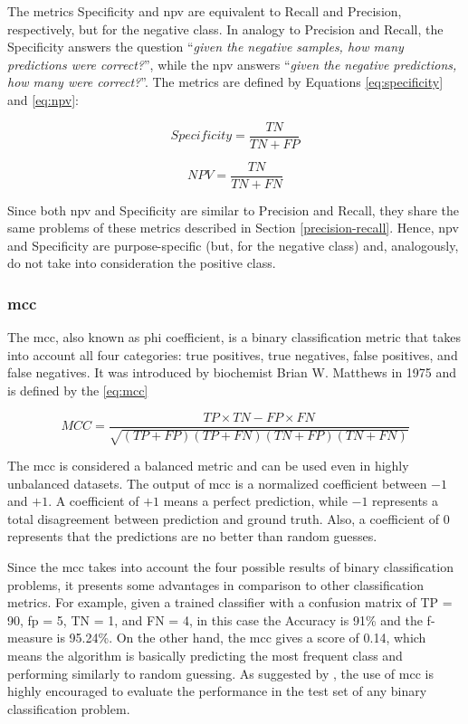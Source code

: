 The metrics Specificity and \acf{npv} are equivalent to Recall and Precision, respectively, but for the negative class. In analogy to Precision and Recall, the Specificity answers the question ``\textit{given the negative samples, how many predictions were correct?}'', while the \acs{npv} answers ``\textit{given the negative predictions, how many were correct?}''. The metrics are defined by Equations \ref{eq:specificity} and \ref{eq:npv}:

\begin{equation}
\label{eq:specificity}
Specificity = \frac{TN}{TN + FP}
\end{equation}

\begin{equation}
\label{eq:npv}
NPV = \frac{TN}{TN + FN}
\end{equation}

Since both \acs{npv} and Specificity are similar to Precision and Recall, they share the same problems of these metrics described in Section \ref{precision-recall}. Hence, \acs{npv} and Specificity are purpose-specific (but, for the negative class) and, analogously, do not take into consideration the positive class.

\subsubsection{\acl{mcc}} \label{sec:mcc}

The \acf{mcc}, also known as phi coefficient, is a binary classification metric that takes into account all four categories: true positives, true negatives, false positives, and false negatives. It was introduced by biochemist Brian W. Matthews in 1975 \citep{matthews1975comparison} and is defined by the \autoref{eq:mcc}

\begin{equation}
\label{eq:mcc}
MCC = \frac{TP \times TN - FP \times FN}{\sqrt{(TP + FP)(TP + FN)(TN + FP)(TN + FN)}}
\end{equation}

The \acs{mcc} is considered a balanced metric and can be used even in highly unbalanced datasets. The output of \acs{mcc} is a normalized coefficient between $-1$ and $+1$. A coefficient of $+1$ means a perfect prediction, while $-1$ represents a total disagreement between prediction and ground truth. Also, a coefficient of $0$ represents that the predictions are no better than random guesses. 

Since the \acs{mcc} takes into account the four possible results of binary classification problems, it presents some advantages in comparison to other classification metrics. For example, given a trained classifier with a confusion matrix of TP = 90, \acs{fp} = 5, TN = 1, and FN = 4, in this case the Accuracy is 91\% and the f-measure is 95.24\%. On the other hand, the \acs{mcc} gives a score of 0.14, which means the algorithm is basically predicting the most frequent class and performing similarly to random guessing. As suggested by \cite{chicco2017ten}, the use of \acs{mcc} is highly encouraged to evaluate the performance in the test set of any binary classification problem.

